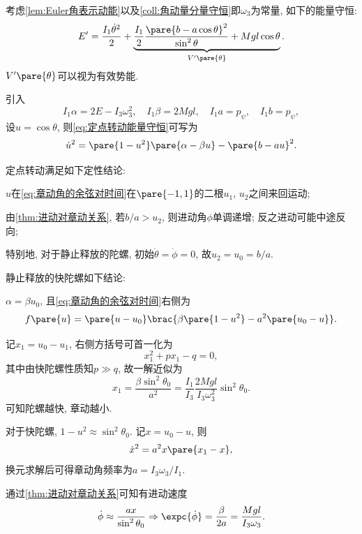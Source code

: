 \documentclass[../TheoreticalMechanics.tex]{subfiles}
\begin{document}
\begin{theorem}[能量守恒]
    考虑\cref{lem:Euler角表示动能}以及\cref{coll:角动量分量守恒}即$\omega_3$为常量, 如下的能量守恒:
    \begin{equation}
        \label{eq:定点转动能量守恒}
        E' = \frac{I_1\dot{\theta}^2}{2} + \underbrace{\frac{I_1}{2}\frac{\pare{b-a\cos\theta}^2}{\sin^2\theta} + Mgl\cos\theta}_{V'\pare{\theta}}.
    \end{equation}
    $V'\pare{\theta}$可以视为有效势能.
\end{theorem}
\begin{finale}
    \begin{theorem}[章动角方程]
        引入
        \[ I_1\alpha = 2E - I_3\omega_3^2,\quad I_1\beta = 2Mgl,\quad  I_1a = p_\psi,\quad I_1b = p_\psi, \]
        设$u = \cos\theta$, 则\eqref{eq:定点转动能量守恒}可写为
        \begin{equation}
            \label{eq:章动角的余弦对时间}
            \dot{u}^2 = \pare{1-u^2}\pare{\alpha - \beta u} - \pare{b-au}^2. 
        \end{equation}
    \end{theorem}
\end{finale}
\begin{corollary}[定点转动的定性分析]
    定点转动满足如下定性结论:
    \begin{cenum}
        \item $u$在\eqref{eq:章动角的余弦对时间}在$\pare{-1,1}$的二根$u_1$, $u_2$之间来回运动;
        \item 由\cref{thm:进动对章动关系}, 若$b/a>u_2$, 则进动角$\phi$单调递增; 反之进动可能中途反向;
        \item 特别地, 对于静止释放的陀螺, 初始$\dot{\theta}=\dot{\phi}=0$, 故$u_2 = u_0 = b/a$.
    \end{cenum}
\end{corollary}
\begin{corollary}[静止释放快陀螺的定量分析]
    静止释放的快陀螺如下结论:
    \begin{cenum}
        \item $\alpha = \beta u_0$, 且\eqref{eq:章动角的余弦对时间}右侧为
        \[ f\pare{u} = \pare{u-u_0}\brac{\beta\pare{1-u^2} - a^2\pare{u_0 - u}}. \]
        \item 记$x_1 = u_0 - u_1$, 右侧方括号可首一化为
        \[ x_1^2 + px_1 - q = 0, \]
        其中由快陀螺性质知$p\gg q$, 故一解近似为
        \[ x_1 = \frac{\beta\sin^2\theta_0}{a^2} = \frac{I_1}{I_3}\frac{2Mgl}{I_3\omega_3^2}\sin^2\theta_0. \]
        可知陀螺越快, 章动越小.
        \item 对于快陀螺, $1-u^2\approx \sin^2\theta_0$. 记$x = u_0 - u$, 则
        \[ \dot{x}^2 = a^2x\pare{x_1 - x}, \]
        换元求解后可得章动角频率为$a = I_3\omega_3/I_1$.
        \item 通过\cref{thm:进动对章动关系}可知有进动速度
        \[ \dot{\phi} \approx \frac{ax}{\sin^2\theta_0} \Rightarrow \expc{\dot{\phi}} = \frac{\beta}{2a} = \frac{Mgl}{I_3\omega_3}. \]
    \end{cenum}
\end{corollary}
\end{document}
